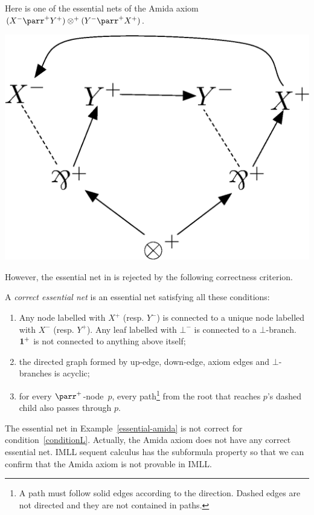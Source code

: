  \begin{example} \label{essential-amida}
  Here is one of the essential nets of
  the Amida axiom $(X^-\parr^+Y^+)\otimes^+(Y^-\parr^+ X^+)$.
   \begin{center}
    \includegraphics[scale=0.4]{amida-essential.eps}
   \end{center}
 \end{example}
 However, the essential net in  is rejected by
 the following correctness criterion.
  \begin{definition}
   A \textit{correct essential net} is an essential net satisfying all
   these conditions:
\begin{enumerate}
 \item Any node labelled with $X^+$ (resp. $Y^-$) is connected to a
       unique node labelled with $X^-$ (resp. $Y^+$).
       Any leaf labelled with $\bot^-$ is connected to a $\bot$-branch.
       $\mathbf{1}^+$ is not connected to anything above itself;
 \item the directed graph formed by up-edge, down-edge, axiom edges and
       $\bot$-branches is acyclic;
 \item \label{conditionL}
       for every $\parr^+$-node~$p$, every path\footnote{A path must
       follow solid edges according to the direction.  Dashed edges are
       not directed and they are not contained in paths.}
       from the root that reaches
       $p$'s dashed child also passes through $p$.
\end{enumerate}
  \end{definition}
The essential net in Example~\ref{essential-amida} is not correct for
condition~\ref{conditionL}.  Actually, the Amida axiom does not have
any correct essential net.  IMLL sequent calculus has the subformula
property so that we can confirm that the Amida axiom is not provable in IMLL.

